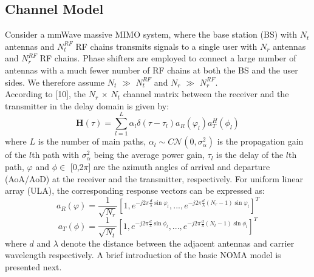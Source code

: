 \documentclass[journal]{IEEEtran}
\begin{document}
\subsection{Channel Model} 
Consider a mmWave massive MIMO system, where the base station (BS) with $N_t$ antennas and $N_t^{RF}$ RF chains transmits signals to a single user with $N_r$
antennas and $N_r^{RF}$ RF chains. Phase shifters are employed to connect a large number of antennas with a much fewer number of RF chains at both the BS and the user sides. We therefore assume $N_t$ $\gg$  $N_t^{RF}$ and $N_r$ $\gg$  $N_r^{RF}$.\\
According to [10], the $N_r$ $\times$ $N_t$ channel matrix between the
receiver and the transmitter in the delay domain is given by:
\begin{equation}
\mathbf{H}(\tau) =  \sum_{l=1}^{L}\alpha_l \delta(\tau - \tau_l)a_R(\varphi_l)a_T^H(\phi_l)
\end{equation}
where $L$ is the number of main paths, $\alpha_l \sim C\mathcal{N}(0,\sigma^2_\alpha)$ is the propagation gain of the $l$th path with $\sigma^2_\alpha$ being the average power
gain, $\tau_l$ is the delay of the $l$th path, $\varphi$ and $\phi \in$ [0,2$\pi$] are the azimuth angles of arrival and departure (AoA/AoD) at the receiver and the transmitter, respectively. For uniform linear array (ULA), the corresponding response vectors can be expressed as:
\begin{equation}
a_R(\varphi) = \frac{1}{\sqrt{N_r}} [1,e^{-j2\pi\frac{d}{\lambda}\sin{\varphi_l}},...,e^{-j2\pi\frac{d}{\lambda}(N_r-1)\sin{\varphi_l}}]^T
\end{equation}
\begin{equation}
a_T(\phi) = \frac{1}{\sqrt{N_t}} [1,e^{-j2\pi\frac{d}{\lambda}\sin{\phi_l}},...,e^{-j2\pi\frac{d}{\lambda}(N_t-1)\sin{\phi_l}}]^T
\end{equation}
where $d$ and $\lambda$ denote the distance between the adjacent antennas
and carrier wavelength respectively. A brief introduction of the basic NOMA model is presented next.
\end{document}
